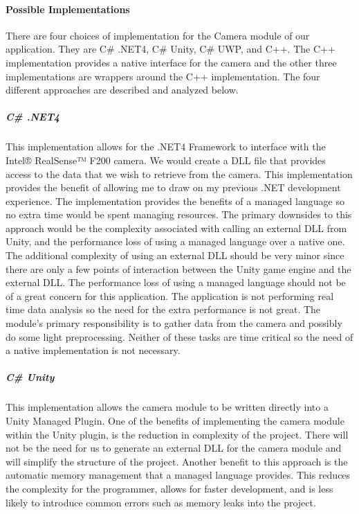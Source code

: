 \documentclass[12pt]{article}
\begin{document}
\paragraph{Possible Implementations}\label{possible-implementations}

There are four choices of implementation for the Camera module of our
application. They are C\# .NET4, C\# Unity, C\# UWP, and C++. The C++
implementation provides a native interface for the camera and the other
three implementations are wrappers around the C++ implementation. The
four different approaches are described and analyzed below.

\subparagraph{C\# .NET4}\label{c-.net4}

This implementation allows for the .NET4 Framework to interface with the
Intel® RealSense™ F200 camera. We would create a DLL file that provides
access to the data that we wish to retrieve from the camera. This
implementation provides the benefit of allowing me to draw on my
previous .NET development experience. The implementation provides the
benefits of a managed language so no extra time would be spent managing
resources. The primary downsides to this approach would be the
complexity associated with calling an external DLL from Unity, and the
performance loss of using a managed language over a native one. The
additional complexity of using an external DLL should be very minor
since there are only a few points of interaction between the Unity game
engine and the external DLL. The performance loss of using a managed
language should not be of a great concern for this application. The
application is not performing real time data analysis so the need for
the extra performance is not great. The module's primary responsibility
is to gather data from the camera and possibly do some light
preprocessing. Neither of these tasks are time critical so the need of a
native implementation is not necessary.

\subparagraph{C\# Unity}\label{c-unity}

This implementation allows the camera module to be written directly into
a Unity Managed Plugin. One of the benefits of implementing the camera
module within the Unity plugin, is the reduction in complexity of the
project. There will not be the need for us to generate an external DLL
for the camera module and will simplify the structure of the project.
Another benefit to this approach is the automatic memory management that
a managed language provides. This reduces the complexity for the
programmer, allows for faster development, and is less likely to
introduce common errors such as memory leaks into the project.
\end{document}
